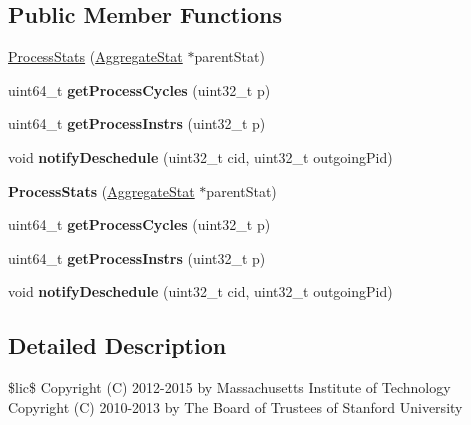 \subsection*{Public Member Functions}
\begin{DoxyCompactItemize}
\item 
\hyperlink{classProcessStats_ada49d8374a41fa144bc16d3d403b16b1}{Process\-Stats} (\hyperlink{classAggregateStat}{Aggregate\-Stat} $\ast$parent\-Stat)
\item 
\hypertarget{classProcessStats_ad64f6bcac81df075ec8965c0246bb5e6}{uint64\-\_\-t {\bfseries get\-Process\-Cycles} (uint32\-\_\-t p)}\label{classProcessStats_ad64f6bcac81df075ec8965c0246bb5e6}

\item 
\hypertarget{classProcessStats_a63231a33cbc3b3f68dd3fb4d3331b5f8}{uint64\-\_\-t {\bfseries get\-Process\-Instrs} (uint32\-\_\-t p)}\label{classProcessStats_a63231a33cbc3b3f68dd3fb4d3331b5f8}

\item 
\hypertarget{classProcessStats_a5853010f79c18d5becd073db341f6a5b}{void {\bfseries notify\-Deschedule} (uint32\-\_\-t cid, uint32\-\_\-t outgoing\-Pid)}\label{classProcessStats_a5853010f79c18d5becd073db341f6a5b}

\item 
\hypertarget{classProcessStats_ada49d8374a41fa144bc16d3d403b16b1}{{\bfseries Process\-Stats} (\hyperlink{classAggregateStat}{Aggregate\-Stat} $\ast$parent\-Stat)}\label{classProcessStats_ada49d8374a41fa144bc16d3d403b16b1}

\item 
\hypertarget{classProcessStats_ad64f6bcac81df075ec8965c0246bb5e6}{uint64\-\_\-t {\bfseries get\-Process\-Cycles} (uint32\-\_\-t p)}\label{classProcessStats_ad64f6bcac81df075ec8965c0246bb5e6}

\item 
\hypertarget{classProcessStats_a63231a33cbc3b3f68dd3fb4d3331b5f8}{uint64\-\_\-t {\bfseries get\-Process\-Instrs} (uint32\-\_\-t p)}\label{classProcessStats_a63231a33cbc3b3f68dd3fb4d3331b5f8}

\item 
\hypertarget{classProcessStats_a5853010f79c18d5becd073db341f6a5b}{void {\bfseries notify\-Deschedule} (uint32\-\_\-t cid, uint32\-\_\-t outgoing\-Pid)}\label{classProcessStats_a5853010f79c18d5becd073db341f6a5b}

\end{DoxyCompactItemize}


\subsection{Detailed Description}
\$lic\$ Copyright (C) 2012-\/2015 by Massachusetts Institute of Technology Copyright (C) 2010-\/2013 by The Board of Trustees of Stanford University

